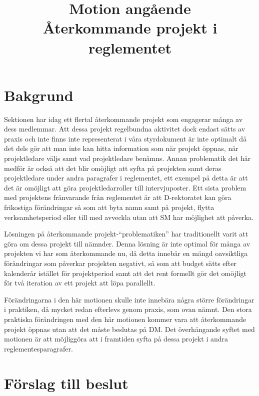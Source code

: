 \documentclass[a4paper]{article}
\title{\textcolor{cerise}{\textbf{
    Motion angående\\
    Återkommande projekt i reglementet
}}}
\date{}
\begin{document}
\maketitle
\thispagestyle{fancy} %

\section*{\textcolor{cerise}{
    Bakgrund
}}

Sektionen har idag ett flertal återkommande projekt som engagerar många av dess medlemmar.
Att dessa projekt regelbundna aktivitet dock endast sätts av praxis och inte finns inte
representerat i våra styrdokument är inte optimalt då det dels gör att man inte kan
hitta information som när projekt öppnas, när projektledare väljs samt vad projektledare benämns.
Annan problematik det här medför är också att det blir omöjligt att syfta på projekten samt deras
projektledare under andra paragrafer i reglementet, ett exempel på detta är att det är omöjligt
att göra projektledarroller till intervjuposter. Ett sista problem med projektens frånvarande
från reglementet är att D-rektoratet kan göra frikostiga förändringar så som att byta namn
samt på projekt, flytta verksamhetsperiod eller till med avveckla utan att SM har möjlighet att påverka.

Lösningen på återkommande projekt-``problematiken'' har traditionellt varit att göra om dessa
projekt till nämnder. Denna lösning är inte optimal för många av projekten vi har som återkommande
nu, då detta innebär en mängd oavsiktliga förändringar som påverkar projekten negativt, så som
att budget sätts efter kalenderår istället för projektperiod samt att det rent formellt gör det
omöjligt för två iteration av ett projekt att löpa parallellt.

Förändringarna i den här motionen skulle inte innebära några större förändringar i praktiken, då
mycket redan efterlevs genom praxis, som ovan nämnt. Den stora praktiska förändringen med den här
motionen kommer vara att återkommande projekt öppnas utan att det måste beslutas på DM.
Det överhängande syftet med motionen är att möjliggöra att i framtiden syfta på dessa projekt i
andra reglementesparagrafer.

\section*{\textcolor{cerise}{
    Förslag till beslut
}}
\end{document}
